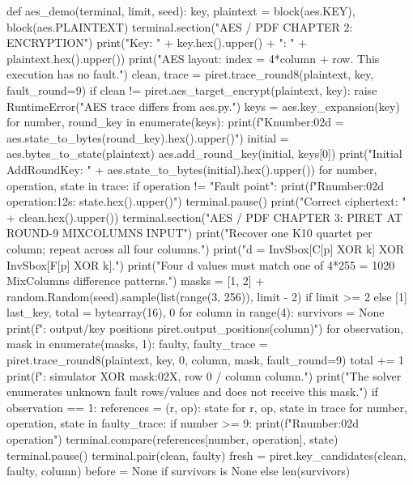 \begin{lightcode}[numbers=left,firstnumber=1]
def aes_demo(terminal, limit, seed):
    key, plaintext = block(aes.KEY), block(aes.PLAINTEXT)
    terminal.section("AES / PDF CHAPTER 2: ENCRYPTION")
    print("Key: " + key.hex().upper() + "\nPlaintext: " + plaintext.hex().upper())
    print("AES layout: index = 4*column + row. This execution has no fault.")
    clean, trace = piret.trace_round8(plaintext, key, fault_round=9)
    if clean != piret.aes_target_encrypt(plaintext, key):
        raise RuntimeError("AES trace differs from aes.py.")
    keys = aes.key_expansion(key)
    for number, round_key in enumerate(keys):
        print(f"K{number:02d} = {aes.state_to_bytes(round_key).hex().upper()}")
    initial = aes.bytes_to_state(plaintext)
    aes.add_round_key(initial, keys[0])
    print("Initial AddRoundKey: " + aes.state_to_bytes(initial).hex().upper())
    for number, operation, state in trace:
        if operation != "Fault point":
            print(f"R{number:02d} {operation:12s}: {state.hex().upper()}")
            terminal.pause()
    print("Correct ciphertext: " + clean.hex().upper())
    terminal.section("AES / PDF CHAPTER 3: PIRET AT ROUND-9 MIXCOLUMNS INPUT")
    print("Recover one K10 quartet per column; repeat across all four columns.")
    print("d = InvSbox[C[p] XOR k] XOR InvSbox[F[p] XOR k].")
    print("Four d values must match one of 4*255 = 1020 MixColumns difference patterns.")
    masks = [1, 2] + random.Random(seed).sample(list(range(3, 256)), limit - 2) if limit >= 2 else [1]
    last_key, total = bytearray(16), 0
    for column in range(4):
        survivors = None
        print(f": output/key positions {piret.output_positions(column)}")
        for observation, mask in enumerate(masks, 1):
            faulty, faulty_trace = piret.trace_round8(plaintext, key, 0, column, mask, fault_round=9)
            total += 1
            print(f": simulator XOR {mask:02X}, row 0 / column {column}.")
            print("The solver enumerates unknown fault rows/values and does not receive this mask.")
            if observation == 1:
                references = {(r, op): state for r, op, state in trace}
                for number, operation, state in faulty_trace:
                    if number >= 9:
                        print(f"R{number:02d} {operation}")
                        terminal.compare(references[number, operation], state)
                        terminal.pause()
            terminal.pair(clean, faulty)
            fresh = piret.key_candidates(clean, faulty, column)
            before = None if survivors is None else len(survivors)

\end{lightcode}
